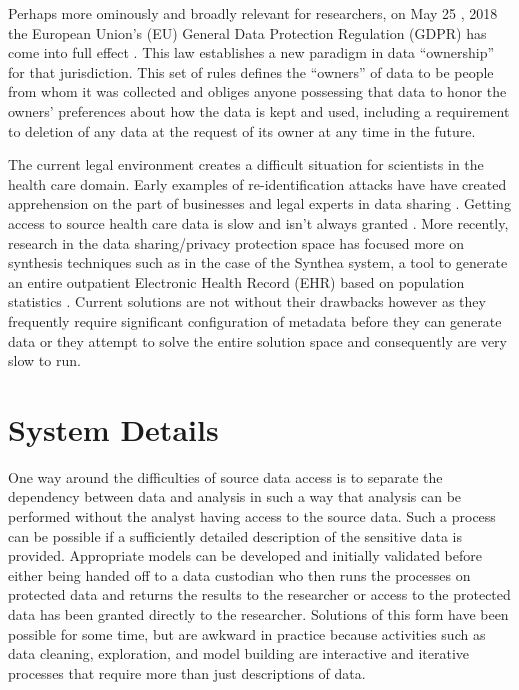 \documentclass{article}
\begin{document}
Perhaps more ominously and broadly relevant for researchers, on May 25 , 2018 the European Union's (EU) General Data Protection Regulation (GDPR) has come into full effect \cite{gdpr}. This law establishes a new paradigm in data ``ownership'' for that jurisdiction. This set of rules defines the ``owners'' of data to be people from whom it was collected and obliges anyone possessing that data to honor the owners' preferences about how the data is kept and used, including a requirement to deletion of any data at the request of its owner at any time in the future.

The current legal environment creates a difficult situation for scientists in the health care domain. Early examples of re-identification attacks \cite{sweeney_2002} have have created apprehension on the part of businesses and legal experts in data sharing \cite{ohm_broken_2009}. Getting access to source health care data is slow and isn't always granted \cite{hodge_legal_1999, committee_hipaa_privacy_rule_2009}. More recently, research in the data sharing/privacy protection space has focused more on synthesis techniques such as in the case of the Synthea system, a tool to generate an entire outpatient Electronic Health Record (EHR) based on population statistics \cite{walonoski_synthea_2018}. Current solutions are not without their drawbacks however as they frequently require significant configuration of metadata before they can generate data or they attempt to solve the entire solution space and consequently are very slow to run.

\section{System Details}

One way around the difficulties of source data access is to separate the dependency between data and analysis in such a way that analysis can be performed without the analyst having access to the source data. Such a process can be possible if a sufficiently detailed description of the sensitive data is provided. Appropriate models can be developed and initially validated before either being handed off to a data custodian who then runs the processes on protected data and returns the results to the researcher or access to the protected data has been granted directly to the researcher. Solutions of this form have been possible for some time, but are awkward in practice because activities such as data cleaning, exploration, and model building are interactive and iterative processes that require more than just descriptions of data.
\end{document}
